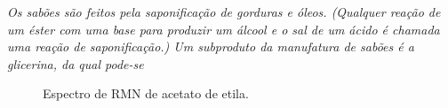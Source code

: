 \emph{Os sabões são feitos pela saponificação de gorduras e óleos. (Qualquer reação de um éster com uma base para produzir um álcool e o sal de um ácido é chamada uma reação de saponificação.) Um subproduto da manufatura de sabões é a glicerina, da qual pode-se}

\begin{figure}[H]
    \centering
    \caption{Espectro de RMN de acetato de etila.}
    \label{fig8_7}
\end{figure}
